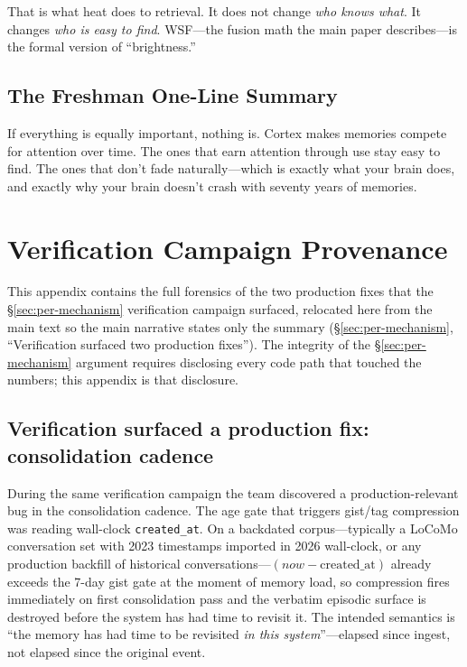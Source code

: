 \documentclass[11pt]{article}
\begin{document}
That is what heat does to retrieval.  It does not change \emph{who
knows what}.  It changes \emph{who is easy to find}.  WSF---the
fusion math the main paper describes---is the formal version of
``brightness.''

\subsection{The Freshman One-Line Summary}
\label{app:feynman-oneline}

If everything is equally important, nothing is.  Cortex makes
memories compete for attention over time.  The ones that earn
attention through use stay easy to find.  The ones that don't fade
naturally---which is exactly what your brain does, and exactly why
your brain doesn't crash with seventy years of memories.

\section{Verification Campaign Provenance}
\label{app:provenance}

This appendix contains the full forensics of the two production
fixes that the \S\ref{sec:per-mechanism} verification campaign
surfaced, relocated here from the main text so the main narrative
states only the summary (\S\ref{sec:per-mechanism}, ``Verification
surfaced two production fixes'').  The integrity of the
\S\ref{sec:per-mechanism} argument requires disclosing every code
path that touched the numbers; this appendix is that disclosure.

\subsection{Verification surfaced a production fix: consolidation cadence}
\label{sec:cadence-fix}

During the same verification campaign the team discovered a
production-relevant bug in the consolidation cadence.  The age gate
that triggers gist/tag compression was reading wall-clock
\texttt{created\_at}.  On a backdated corpus---typically a LoCoMo
conversation set with 2023 timestamps imported in 2026 wall-clock,
or any production backfill of historical conversations---$(now -
\text{created\_at})$ already exceeds the 7-day gist gate at the
moment of memory load, so compression fires immediately on first
consolidation pass and the verbatim episodic surface is destroyed
before the system has had time to revisit it.  The intended
semantics is ``the memory has had time to be revisited \emph{in this
system}''---elapsed since ingest, not elapsed since the original
event.
\end{document}
